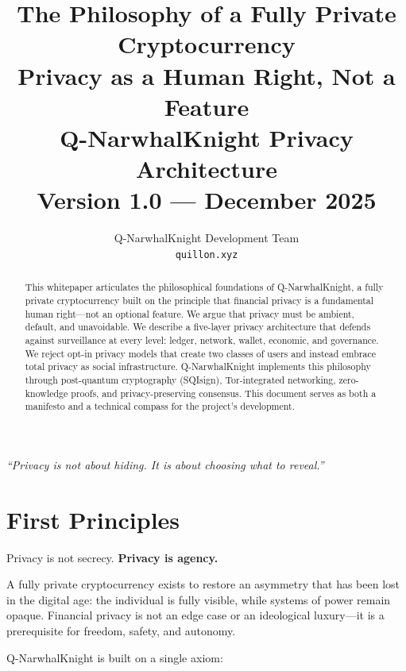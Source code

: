 \documentclass[12pt,a4paper]{article}
\title{
\vspace{-2cm}
\textbf{\Huge The Philosophy of a Fully Private Cryptocurrency}\\[0.5cm]
\Large Privacy as a Human Right, Not a Feature\\[1cm]
\large Q-NarwhalKnight Privacy Architecture\\[0.5cm]
\normalsize Version 1.0 --- December 2025
}
\author{
Q-NarwhalKnight Development Team\\
\texttt{quillon.xyz}
}
\date{}
\begin{document}
\maketitle
\thispagestyle{empty}

\begin{abstract}
\noindent
This whitepaper articulates the philosophical foundations of Q-NarwhalKnight, a fully private cryptocurrency built on the principle that financial privacy is a fundamental human right---not an optional feature. We argue that privacy must be ambient, default, and unavoidable. We describe a five-layer privacy architecture that defends against surveillance at every level: ledger, network, wallet, economic, and governance. We reject opt-in privacy models that create two classes of users and instead embrace total privacy as social infrastructure. Q-NarwhalKnight implements this philosophy through post-quantum cryptography (SQIsign), Tor-integrated networking, zero-knowledge proofs, and privacy-preserving consensus. This document serves as both a manifesto and a technical compass for the project's development.
\end{abstract}

\vfill
\begin{center}
\textit{``Privacy is not about hiding. It is about choosing what to reveal.''}
\end{center}
\vfill

\newpage
\tableofcontents
\newpage

\section{First Principles}

Privacy is not secrecy. \textbf{Privacy is agency.}

A fully private cryptocurrency exists to restore an asymmetry that has been lost in the digital age: the individual is fully visible, while systems of power remain opaque. Financial privacy is not an edge case or an ideological luxury---it is a prerequisite for freedom, safety, and autonomy.

Q-NarwhalKnight is built on a single axiom:

\begin{center}
\end{center}
\end{document}
